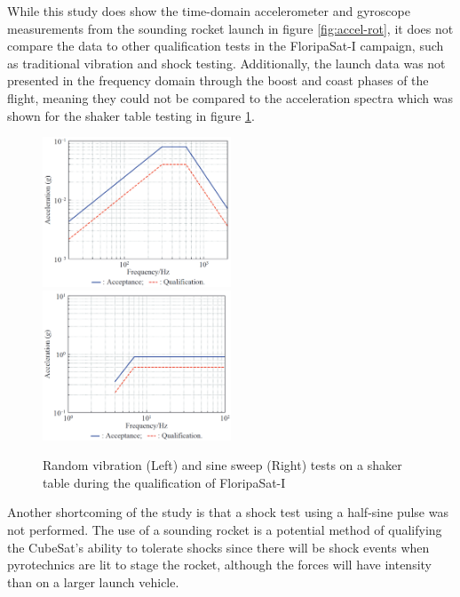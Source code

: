 \documentclass[a4paper,11pt]{article}
\begin{document}
While this study does show the time-domain accelerometer and gyroscope measurements from the sounding rocket launch in figure \ref{fig:accel-rot}, it does not compare the data to other qualification tests in the FloripaSat-I campaign, such as traditional vibration and shock testing. Additionally, the launch data was not presented in the frequency domain through the boost and coast phases of the flight, meaning they could not be compared to the acceleration spectra which was shown for the shaker table testing in figure \ref{fig:shaker}.

\begin{figure}[H]
  \includegraphics[width=0.5\textwidth]{images/floripa-random-spectrum.png}
  \includegraphics[width=0.5\textwidth]{images/floripa-sinusoid.png}
  \label{fig:shaker}
  \caption{Random vibration (Left) and sine sweep (Right) tests on a shaker table during the qualification of FloripaSat-I \cite{9316404}}
\end{figure}

Another shortcoming of the study is that a shock test using a half-sine pulse was not performed. The use of a sounding rocket is a potential method of qualifying the CubeSat's ability to tolerate shocks since there will be shock events when pyrotechnics are lit to stage the rocket, although the forces will have intensity than on a larger launch vehicle.
\end{document}
